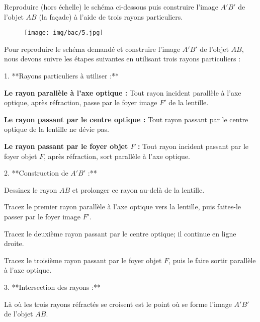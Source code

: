 \documentclass[answers]{exam}
\begin{document}
\begin{questions}

\question[1] Reproduire (hors échelle) le schéma ci-dessous puis construire l'image $A'B'$ de l'objet $AB$ (la façade) à l'aide de trois rayons particuliers.

\begin{figure}[H]
  \centering
  \texttt{[image: img/bac/5.jpg]}
\end{figure}



\begin{solution}
Pour reproduire le schéma demandé et construire l'image $A'B'$ de l'objet $AB$, nous devons suivre les étapes suivantes en utilisant trois rayons particuliers :

1. **Rayons particuliers à utiliser :**

   \begin{compactitem}
       \item \textbf{Le rayon parallèle à l'axe optique :} Tout rayon incident parallèle à l'axe optique, après réfraction, passe par le foyer image $F'$ de la lentille.
       \item \textbf{Le rayon passant par le centre optique :} Tout rayon passant par le centre optique de la lentille ne dévie pas.
       \item \textbf{Le rayon passant par le foyer objet $F$ :} Tout rayon incident passant par le foyer objet $F$, après réfraction, sort parallèle à l'axe optique.
   \end{compactitem}

2. **Construction de $A'B'$ :**

   \begin{compactitem}
       \item Dessinez le rayon $AB$ et prolonger ce rayon au-delà de la lentille.
       \item Tracez le premier rayon parallèle à l'axe optique vers la lentille, puis faites-le passer par le foyer image $F'$.
       \item Tracez le deuxième rayon passant par le centre optique; il continue en ligne droite.
       \item Tracez le troisième rayon passant par le foyer objet $F$, puis le faire sortir parallèle à l'axe optique.
   \end{compactitem}

3. **Intersection des rayons :**

   Là où les trois rayons réfractés se croisent est le point où se forme l'image $A'B'$ de l'objet $AB$.


\end{solution}
\end{questions}
\end{document}
